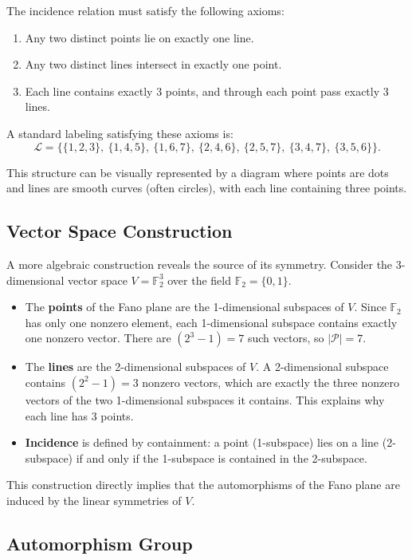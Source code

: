 \documentclass[12pt,a4paper,openany]{book}
\begin{document}
The incidence relation must satisfy the following axioms:
\begin{enumerate}[label=(\roman*)]
    \item Any two distinct points lie on exactly one line.
    \item Any two distinct lines intersect in exactly one point.
    \item Each line contains exactly 3 points, and through each point pass exactly 3 lines.
\end{enumerate}

A standard labeling satisfying these axioms is:
\[
\mathcal{L} = \{
\{1,2,3\},\
\{1,4,5\},\
\{1,6,7\},\
\{2,4,6\},\
\{2,5,7\},\
\{3,4,7\},\
\{3,5,6\}
\}.
\]

This structure can be visually represented by a diagram where points are dots and lines are smooth curves (often circles), with each line containing three points.

\subsection*{Vector Space Construction}

A more algebraic construction reveals the source of its symmetry. Consider the 3-dimensional vector space $V = \mathbb{F}_2^3$ over the field $\mathbb{F}_2 = \{0, 1\}$.
\begin{itemize}
    \item The \textbf{points} of the Fano plane are the 1-dimensional subspaces of $V$. Since $\mathbb{F}_2$ has only one nonzero element, each 1-dimensional subspace contains exactly one nonzero vector. There are $(2^3 - 1) = 7$ such vectors, so $|\mathcal{P}| = 7$.
    \item The \textbf{lines} are the 2-dimensional subspaces of $V$. A 2-dimensional subspace contains $(2^2 - 1) = 3$ nonzero vectors, which are exactly the three nonzero vectors of the two 1-dimensional subspaces it contains. This explains why each line has 3 points.
    \item \textbf{Incidence} is defined by containment: a point (1-subspace) lies on a line (2-subspace) if and only if the 1-subspace is contained in the 2-subspace.
\end{itemize}

This construction directly implies that the automorphisms of the Fano plane are induced by the linear symmetries of $V$.

\subsection*{Automorphism Group}
\end{document}
